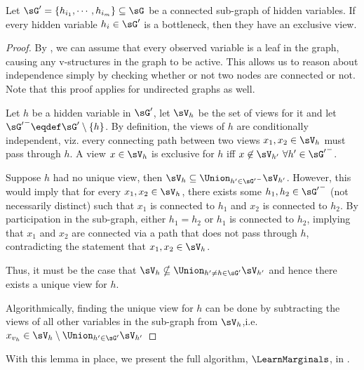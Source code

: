 \begin{lemma}
  \label{lem:bottleneck-views}  
Let $\sG' = \{ h_{i_1}, \cdots, h_{i_m} \} \subseteq \sG$ be
  a connected sub-graph of hidden variables. If every hidden variable
  $h_i \in \sG'$ is a bottleneck, then they have an exclusive view.
\end{lemma}
\begin{proof}
  By , we can assume that every observed
  variable is a leaf in the graph, causing any v-structures in the graph
  to be active. This allows us to reason about independence simply by
  checking whether or not two nodes are connected or not. Note that this
  proof applies for undirected graphs as well.

  Let $h$ be a hidden variable in $\sG'$, let $\sV_{h}$ be the set of
  views for it and let ${\sG'}^- \eqdef \sG' \setminus \{h\}$.
  By definition, the views of $h$ are conditionally independent, viz.
    every connecting path between two views $x_1, x_2 \in \sV_h$ must pass through
    $h$.
  A view $x \in \sV_{h}$ is exclusive for $h$ iff $x \not\in \sV_{h'} ~ \forall h'
  \in {\sG'}^-$.

  Suppose $h$ had no unique view, then $\sV_{h} \subseteq \Union_{h' \in {\sG'}^-} \sV_{h'}$. 
  However, this would imply that for every $x_1, x_2 \in \sV_{h}$, there
  exists some $h_1, h_2 \in {\sG'}^-$ (not necessarily distinct) such that
    $x_1$ is connected to $h_1$ and $x_2$ is connected to $h_2$.
  By participation in the sub-graph, either $h_1 = h_2$ or $h_1$ is
    connected to $h_2$, implying that $x_1$ and $x_2$ are connected
    via a path that does not pass through $h$, contradicting the
    statement that $x_1, x_2 \in \sV_h$. 
    
  Thus, it must be the case that $\sV_{h} \nsubseteq \Union_{h' \neq
    h \in \sG'} \sV_{h'}$ and hence there exists a unique view for $h$.

  Algorithmically, finding the unique view for $h$ can be done by
  subtracting the views of all other variables in the sub-graph from
  $\sV_h$,i.e. $x_{v_h} \in \sV_h \setminus \Union_{h' \in \sG'} \sV_{h'}$
\end{proof}

With this lemma in place, we present the full algorithm, $\LearnMarginals$,
in .

